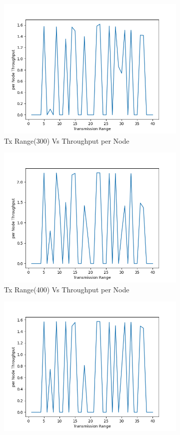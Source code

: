 \begin{figure}[h]
\begin{subfigure}{.5\textwidth}
    \includegraphics[width=.8\linewidth]{_15_4_static/TransmissionRange(300)vsperNodeThroughput.png}
         \caption{Tx Range(300) Vs Throughput per Node}
        \end{subfigure}
\begin{subfigure}{.5\textwidth}
    \centering
    \includegraphics[width=.8\linewidth]{_15_4_static/TransmissionRange(400)vsperNodeThroughput.png}
         \caption{Tx Range(400) Vs Throughput per Node}
        \end{subfigure}
\begin{subfigure}{.5\textwidth}
    \centering
    \includegraphics[width=.8\linewidth]{_15_4_static/TransmissionRange(500)vsperNodeThroughput.png}

\end{subfigure}
\end{figure}
